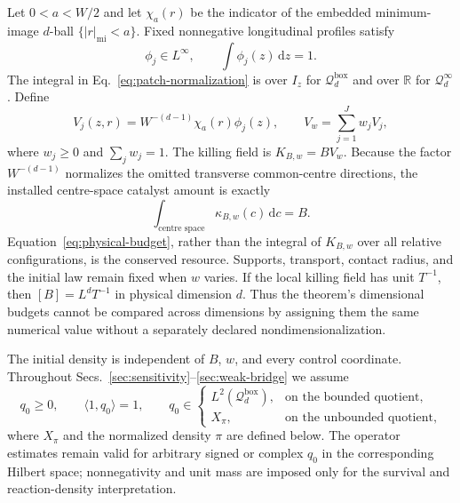 \documentclass[aps,physrev,onecolumn,amsmath,amssymb,longbibliography]{revtex4-2}
\newcommand{\dd}{\mathrm d}
\newcommand{\Qbox}{\mathcal Q_d^{\mathrm{box}}}
\newcommand{\Qinf}{\mathcal Q_d^{\infty}}
\begin{document}
Let \(0<a<W/2\) and let \(\chi_a(r)\) be the indicator of the embedded
minimum-image \(d\)-ball \(\{|r|_{\mathrm{mi}}<a\}\).  Fixed nonnegative
longitudinal profiles satisfy
\begin{equation}
 \phi_j\in L^\infty,\qquad \int\phi_j(z)\,\dd z=1.
 \label{eq:patch-normalization}
\end{equation}
The integral in Eq.~\eqref{eq:patch-normalization} is over \(I_z\) for
\(\Qbox\) and over \(\mathbb R\) for \(\Qinf\).
Define
\begin{equation}
 V_j(z,r)=W^{-(d-1)}\chi_a(r)\phi_j(z),\qquad
 V_w=\sum_{j=1}^Jw_jV_j,
 \label{eq:profiles}
\end{equation}
where \(w_j\ge0\) and \(\sum_jw_j=1\).  The killing field is
\(K_{B,w}=BV_w\).  Because the factor \(W^{-(d-1)}\) normalizes the omitted
transverse common-centre directions, the installed centre-space catalyst
amount is exactly
\begin{equation}
 \int_{\text{centre space}}\kappa_{B,w}(c)\,\dd c=B.
 \label{eq:physical-budget}
\end{equation}
Equation~\eqref{eq:physical-budget}, rather than the integral of \(K_{B,w}\)
over all relative configurations, is the conserved resource.  Supports,
transport, contact radius, and the initial law remain fixed when \(w\) varies.
If the local killing field has unit \(T^{-1}\), then
\([B]=L^dT^{-1}\) in physical dimension \(d\).  Thus the theorem's
dimensional budgets cannot be compared across dimensions by assigning them
the same numerical value without a separately declared nondimensionalization.

The initial density is independent of \(B\), \(w\), and every control
coordinate.  Throughout Secs.~\ref{sec:sensitivity}--\ref{sec:weak-bridge} we
assume
\begin{equation}
 q_0\ge0,\qquad \langle1,q_0\rangle=1,\qquad
 q_0\in
 \begin{cases}
  L^2(\Qbox),&\text{on the bounded quotient},\\
  X_\pi,&\text{on the unbounded quotient},
 \end{cases}
 \label{eq:initial-state-hypotheses}
\end{equation}
where \(X_\pi\) and the normalized density \(\pi\) are defined below.  The
operator estimates remain valid for arbitrary signed or complex \(q_0\) in the
corresponding Hilbert space; nonnegativity and unit mass are imposed only for
the survival and reaction-density interpretation.
\end{document}

